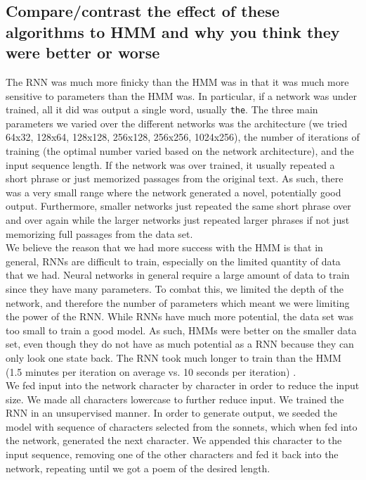 \subsection{Compare/contrast the effect of these algorithms to HMM and why you think they were better or worse}
The RNN was much more finicky than the HMM was in that it was much more sensitive to parameters than the HMM was. In particular, if a network was under trained, all it did was output a single word, usually \texttt{the}. The three main parameters we varied over the different networks was the architecture (we tried 64x32, 128x64, 128x128, 256x128, 256x256, 1024x256), the number of iterations of training (the optimal number varied based on the network architecture), and the input sequence length. If the network was over trained, it usually repeated a short phrase or just memorized passages from the original text. As such, there was a very small range where the network generated a novel, potentially good output. Furthermore, smaller networks just repeated the same short phrase over and over again while the larger networks just repeated larger phrases if not just memorizing full passages from the data set. \\
\indent We believe the reason that we had more success with the HMM is that in general, RNNs are difficult to train, especially on the limited quantity of data that we had. Neural networks in general require a large amount of data to train since they have many parameters. To combat this, we limited the depth of the network, and therefore the number of parameters which meant we were limiting the power of the RNN. While RNNs have much more potential, the data set was too small to train a good model. As such, HMMs were better on the smaller data set, even though they do not have as much potential as a RNN because they can only look one state back. The RNN took much longer to train than the HMM (1.5 minutes per iteration on average vs. 10 seconds per iteration) . \\
\indent We fed input into the network character by character in order to reduce the input size. We made all characters lowercase to further reduce input. We trained the RNN in an unsupervised manner. In order to generate output, we seeded the model with sequence of characters selected from the sonnets, which when fed into the network, generated the next character. We appended this character to the input sequence, removing one of the other characters and fed it back into the network, repeating until we got a poem of the desired length. \\
